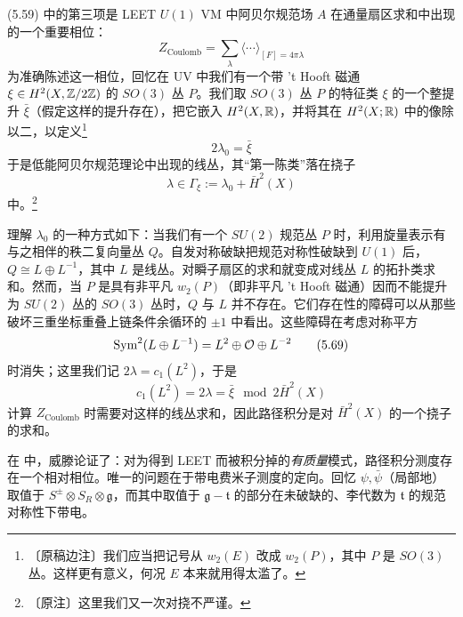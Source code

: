 (5.59) 中的第三项是 LEET $U(1)$ VM 中阿贝尔规范场 $A$ 在通量扇区求和中出现的一个重要相位：
\begin{equation}
Z_{\text{Coulomb}}=\sum_{\lambda}\langle\cdots\rangle_{[F]=4\pi\lambda}
\tag{5.66}
\end{equation}
为准确陈述这一相位，回忆在 UV 中我们有一个带 't Hooft 磁通 $\xi\in H^{2}(X,\mathbb{Z}/2\mathbb{Z})$ 的 $SO(3)$ 丛 $P$。我们取 $SO(3)$ 丛 $P$ 的特征类 $\xi$ 的一个整提升 $\bar\xi$（假定这样的提升存在），把它嵌入 $H^{2}(X,\mathbb{R})$，并将其在 $H^{2}(X;\mathbb{R})$ 中的像除以二，以定义\footnote{〔原稿边注〕我们应当把记号从 $w_{2}(E)$ 改成 $w_{2}(P)$，其中 $P$ 是 $SO(3)$ 丛。这样更有意义，何况 $E$ 本来就用得太滥了。}
\begin{equation}
2\lambda_{0}=\bar\xi
\tag{5.67}
\end{equation}
于是低能阿贝尔规范理论中出现的线丛，其“第一陈类”落在挠子
\begin{equation}
\lambda\in\Gamma_{\xi}:=\lambda_{0}+\bar H^{2}(X)
\tag{5.68}
\end{equation}
中。\footnote{〔原注〕这里我们又一次对挠不严谨。}

理解 $\lambda_{0}$ 的一种方式如下：当我们有一个 $SU(2)$ 规范丛 $P$ 时，利用旋量表示有与之相伴的秩二复向量丛 $Q$。自发对称破缺把规范对称性破缺到 $U(1)$ 后，$Q\cong L\oplus L^{-1}$，其中 $L$ 是线丛。对瞬子扇区的求和就变成对线丛 $L$ 的拓扑类求和。然而，当 $P$ 是具有非平凡 $w_{2}(P)$（即非平凡 't Hooft 磁通）因而不能提升为 $SU(2)$ 丛的 $SO(3)$ 丛时，$Q$ 与 $L$ 并不存在。它们存在性的障碍可以从那些破坏三重坐标重叠上链条件余循环的 $\pm1$ 中看出。这些障碍在考虑对称平方
\begin{equation}
\operatorname{Sym}^{2}(L\oplus L^{-1})=L^{2}\oplus\mathcal{O}\oplus L^{-2}
\tag{5.69}
\end{equation}
时消失；这里我们记 $2\lambda=c_{1}(L^{2})$，于是
\begin{equation}
c_{1}(L^{2})=2\lambda=\bar\xi \mod 2\bar H^{2}(X)
\tag{5.70}
\end{equation}
计算 $Z_{\text{Coulomb}}$ 时需要对这样的线丛求和，因此路径积分是对 $\bar H^{2}(X)$ 的一个挠子的求和。

在 \cite{ref56} 中，威滕论证了：对为得到 LEET 而被积分掉的\emph{有质量}模式，路径积分测度存在一个相对相位。唯一的问题在于带电费米子测度的定向。回忆 $\psi,\bar\psi$（局部地）取值于 $S^{\pm}\otimes S_{R}\otimes\mathfrak{g}$，而其中取值于 $\mathfrak{g}-\mathfrak{t}$ 的部分在未破缺的、李代数为 $\mathfrak{t}$ 的规范对称性下带电。

